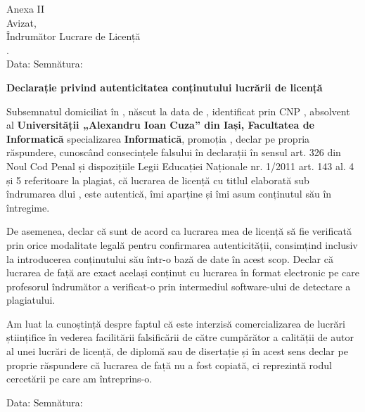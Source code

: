 \vspace*{\fill}

\begin{flushright}
    Anexa II \\
    Avizat, \\
    Îndrumător Lucrare de Licență \\
    \coordinator. \\
    Data: \dottedline \hspace{1cm} Semnătura: \dottedline
\end{flushright}

\vspace{1cm}
\begin{center}
    \large
    \textbf{Declarație privind autenticitatea conținutului lucrării de licență}
\end{center}

Subsemnatul \textbf{\authornamelf} domiciliat în \textbf{\authoraddress}, născut la data de \textbf{\authorbirth}, identificat prin 
CNP \textbf{\authorcnp}, absolvent al \textbf{Universității „Alexandru Ioan Cuza” din Iași, Facultatea de Informatică} specializarea \textbf{Informatică}, 
promoția \promotion, declar pe propria răspundere, cunoscând consecințele falsului în declarații în sensul art. 326 din Noul Cod Penal și 
dispozițiile Legii Educației Naționale nr. 1/2011 art. 143 al. 4 și 5 referitoare la plagiat, că lucrarea de licență cu titlul 
\textbf{\thesistitle} elaborată sub îndrumarea dlui \textbf{\coordinator}, este autentică, îmi aparține și îmi asum conținutul său 
în întregime.

De asemenea, declar că sunt de acord ca lucrarea mea de licență să fie verificată prin orice modalitate legală pentru confirmarea 
autenticității, consimțind inclusiv la introducerea conținutului său într-o bază de date în acest scop. Declar că lucrarea de față 
are exact același conținut cu lucrarea în format electronic pe care profesorul îndrumător a verificat-o prin intermediul software-ului 
de detectare a plagiatului. 

Am luat la cunoștință despre faptul că este interzisă comercializarea de lucrări științifice în vederea facilitării falsificării de 
către cumpărător a calității de autor al unei lucrări de licență, de diplomă sau de disertație și în acest sens declar pe proprie 
răspundere că lucrarea de față nu a fost copiată, ci reprezintă rodul cercetării pe care am întreprins-o.

\begin{flushright}
    Data: \dottedline \hspace{6cm} Semnătura: \dottedline
\end{flushright}

\vspace*{\fill}
\pagebreak